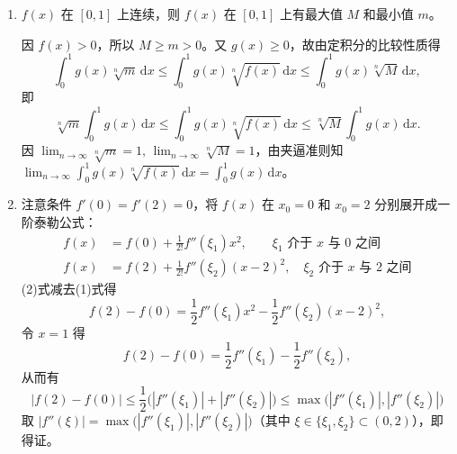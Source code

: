 \documentclass[a4paper,11pt]{ctexart}
\newcommand{\dd}{\,\mathrm{d}}
\begin{document}
\begin{enumerate}[label=\arabic*., start=19, leftmargin=2em, itemsep=0.9em, topsep=0.5em]
  \item $f(x)$ 在 $[0,1]$ 上连续，则 $f(x)$ 在 $[0,1]$ 上有最大值 $M$ 和最小值 $m$。

  因 $f(x)>0$，所以 $M\ge m>0$。又 $g(x)\ge 0$，故由定积分的比较性质得
  \[
    \int_0^1 g(x)\sqrt[n]{m}\dd x \le \int_0^1 g(x)\sqrt[n]{f(x)}\dd x \le \int_0^1 g(x)\sqrt[n]{M}\dd x,
  \]
  即
  \[
    \sqrt[n]{m}\int_0^1 g(x)\dd x \le \int_0^1 g(x)\sqrt[n]{f(x)}\dd x \le \sqrt[n]{M}\int_0^1 g(x)\dd x.
  \]
  因 $\displaystyle\lim_{n\to\infty}\sqrt[n]{m}=1,\,\lim_{n\to\infty}\sqrt[n]{M}=1$，由夹逼准则知 $\displaystyle\lim_{n\to\infty}\int_0^1 g(x)\sqrt[n]{f(x)}\dd x=\int_0^1 g(x)\dd x$。

  \item 注意条件 $f'(0)=f'(2)=0$，将 $f(x)$ 在 $x_0=0$ 和 $x_0=2$ 分别展开成一阶泰勒公式：
  \begin{align*}
    f(x) &= f(0)+\frac{1}{2!}f''(\xi_1)x^2,\qquad \xi_1\text{ 介于 }x\text{ 与 }0\text{ 之间} \tag*{(1)}\\
    f(x) &= f(2)+\frac{1}{2!}f''(\xi_2)(x-2)^2,\quad \xi_2\text{ 介于 }x\text{ 与 }2\text{ 之间} \tag*{(2)}
  \end{align*}
  (2)式减去(1)式得
  \[
    f(2)-f(0)=\frac{1}{2}f''(\xi_1)x^2-\frac{1}{2}f''(\xi_2)(x-2)^2,
  \]
  令 $x=1$ 得
  \[
    f(2)-f(0)=\frac{1}{2}f''(\xi_1)-\frac{1}{2}f''(\xi_2),
  \]
  从而有
  \[
    |f(2)-f(0)|\le\frac{1}{2}\bigl(|f''(\xi_1)|+|f''(\xi_2)|\bigr)\le\max\bigl(|f''(\xi_1)|,|f''(\xi_2)|\bigr)
  \]
  取 $|f''(\xi)|=\max\bigl(|f''(\xi_1)|,|f''(\xi_2)|\bigr)$（其中 $\xi\in\{\xi_1,\xi_2\}\subset(0,2)$），即得证。
\end{enumerate}
\end{document}
